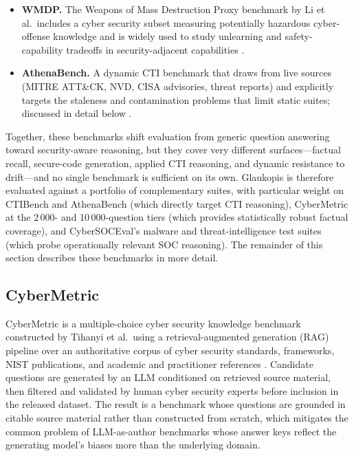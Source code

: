 \documentclass[unnumsec,webpdf,contemporary,large]{oup-authoring-template}
\theoremstyle{thmstyleone}
\theoremstyle{thmstyletwo}
\theoremstyle{thmstylethree}
\begin{document}
\begin{itemize}
  \item \textbf{WMDP.} The Weapons of Mass Destruction Proxy benchmark by Li et al.\ includes a cyber security subset measuring potentially hazardous cyber-offense knowledge and is widely used to study unlearning and safety-capability tradeoffs in security-adjacent capabilities \cite{li2024wmdp}.
  \item \textbf{AthenaBench.} A dynamic CTI benchmark that draws from live sources (MITRE ATT\&CK, NVD, CISA advisories, threat reports) and explicitly targets the staleness and contamination problems that limit static suites; discussed in detail below \cite{alam2025athenabench}.
\end{itemize}

Together, these benchmarks shift evaluation from generic question answering toward security-aware reasoning, but they cover very different surfaces---factual recall, secure-code generation, applied CTI reasoning, and dynamic resistance to drift---and no single benchmark is sufficient on its own. Glaukopis is therefore evaluated against a portfolio of complementary suites, with particular weight on CTIBench and AthenaBench (which directly target CTI reasoning), CyberMetric at the 2\,000- and 10\,000-question tiers (which provides statistically robust factual coverage), and CyberSOCEval's malware and threat-intelligence test suites (which probe operationally relevant SOC reasoning). The remainder of this section describes these benchmarks in more detail.

\subsection{CyberMetric}
\label{sec:cybermetric}

CyberMetric is a multiple-choice cyber security knowledge benchmark constructed by Tihanyi et al.\ using a retrieval-augmented generation (RAG) pipeline over an authoritative corpus of cyber security standards, frameworks, NIST publications, and academic and practitioner references \cite{tihanyi2024cybermetric}. Candidate questions are generated by an LLM conditioned on retrieved source material, then filtered and validated by human cyber security experts before inclusion in the released dataset. The result is a benchmark whose questions are grounded in citable source material rather than constructed from scratch, which mitigates the common problem of LLM-as-author benchmarks whose answer keys reflect the generating model's biases more than the underlying domain.
\end{document}
